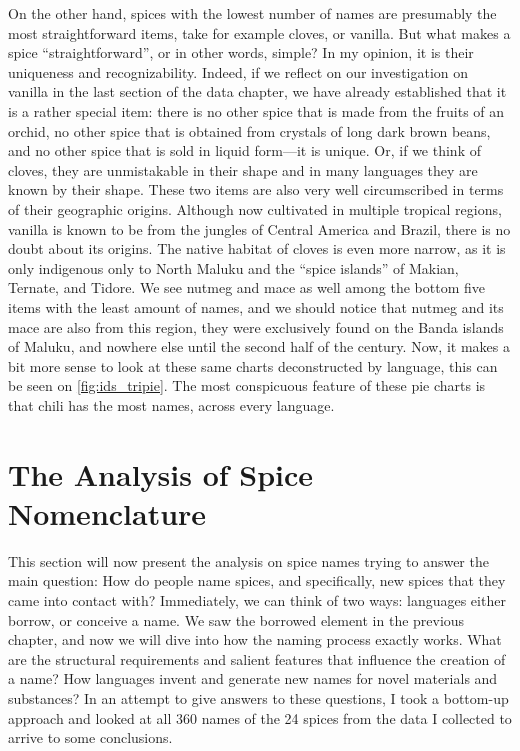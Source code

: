 On the other hand, spices with the lowest number of names are presumably the most straightforward items, take for example cloves, or vanilla. But what makes a spice ``straightforward'', or in other words, simple? In my opinion, it is their uniqueness and recognizability. Indeed, if we reflect on our investigation on vanilla in the last section of the data chapter, we have already established that it is a rather special item: there is no other spice that is made from the fruits of an orchid, no other spice that is obtained from crystals of long dark brown beans, and no other spice that is sold in liquid form---it is unique. Or, if we think of cloves, they are unmistakable in their shape and in many languages they are known by their shape. These two items are also very well circumscribed in terms of their geographic origins. Although now cultivated in multiple tropical regions, vanilla is known to be from the jungles of Central America and Brazil, there is no doubt about its origins. The native habitat of cloves is even more narrow, as it is only indigenous only to North Maluku and the ``spice islands'' of Makian, Ternate, and Tidore. We see nutmeg and mace as well among the bottom five items with the least amount of names, and we should notice that nutmeg and its mace are also from this region, they were exclusively found on the Banda islands of Maluku, and nowhere else until the second half of the  century. Now, it makes a bit more sense to look at these same charts deconstructed by language, this can be seen on \cref{fig:ids_tripie}. The most conspicuous feature of these pie charts is that chili has the most names, across every language.



\section{The Analysis of Spice Nomenclature}
\label{sec:analysis}

This section will now present the analysis on spice names trying to answer the main question: How do people name spices, and specifically, new spices that they came into contact with? Immediately, we can think of two ways: languages either borrow, or conceive a name. We saw the borrowed element in the previous chapter, and now we will dive into how the naming process exactly works. What are the  structural requirements and salient features that influence the creation of a name? How languages invent and generate new names for novel materials and substances? In an attempt to give answers to these questions, I took a bottom-up approach and looked at all 360 names of the 24 spices from the data I collected to arrive to some conclusions. 

